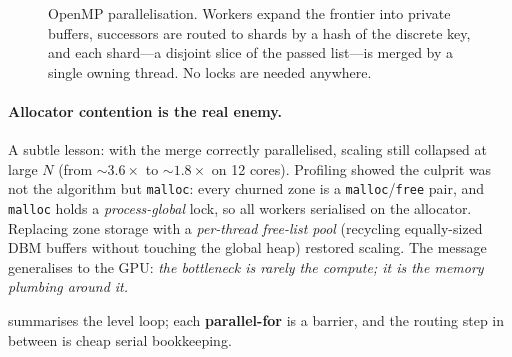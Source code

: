 \documentclass[11pt]{article}
\newcommand{\dk}{\ensuremath{\mathit{dk}}}
\newcommand{\code}[1]{\texttt{\small #1}}
\begin{document}
\begin{figure}[t]
\centering
{}
\caption{OpenMP parallelisation. Workers expand the frontier into private buffers, successors are
routed to shards by a hash of the discrete key, and each shard---a disjoint slice of the passed
list---is merged by a single owning thread. No locks are needed anywhere.}
\label{fig:omp}
\end{figure}

\paragraph{Allocator contention is the real enemy.} A subtle lesson: with the merge correctly
parallelised, scaling still collapsed at large $N$ (from ${\sim}3.6\times$ to ${\sim}1.8\times$ on
12 cores). Profiling showed the culprit was not the algorithm but \code{malloc}: every churned
zone is a \code{malloc}/\code{free} pair, and \code{malloc} holds a \emph{process-global} lock, so
all workers serialised on the allocator. Replacing zone storage with a \emph{per-thread free-list
pool} (recycling equally-sized DBM buffers without touching the global heap) restored scaling. The
message generalises to the GPU: \emph{the bottleneck is rarely the compute; it is the memory
plumbing around it.}

 summarises the level loop; each \textbf{parallel-for} is a barrier, and the routing
step in between is cheap serial bookkeeping.
\end{document}
